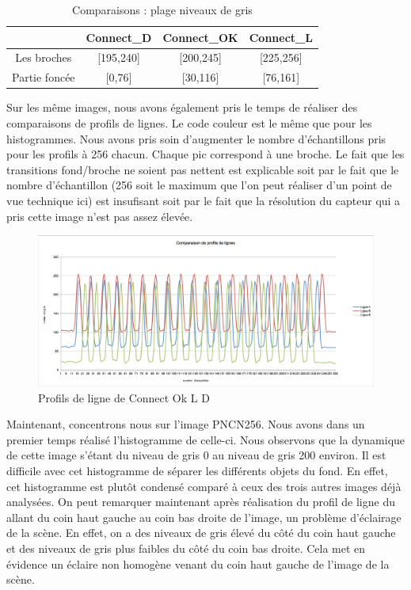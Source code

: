 \documentclass{scrreprt}
\begin{document}
\begin{table}[!h]
	\begin{center}
		\begin{tabular}{|c|c|c|c|}
		   \hline
		   & Connect_D & Connect_OK & Connect_L \\
		   \hline
		   Les broches & [195,240]& [200,245] & [225,256]\\
		   \hline
		   Partie foncée & [0,76] & [30,116] & [76,161]\\
		   \hline
		\end{tabular}
	\end{center}
	\caption{Comparaisons : plage niveaux de gris}
\end{table}

\newpage
Sur les même images, nous avons également pris le temps de réaliser des comparaisons de profils de lignes. Le code couleur est le même
que pour les histogrammes. Nous avons pris soin d'augmenter le nombre d'échantillons pris pour les profils à 256 chacun. Chaque pic 
correspond à une broche. Le fait que les transitions fond/broche ne soient pas nettent est explicable soit par le fait que le nombre
d'échantillon (256 soit le maximum que l'on peut réaliser d'un point de vue technique ici) est insufisant soit par le fait que la résolution
du capteur qui a pris cette image n'est pas assez élevée.

\begin{figure}[!h]
\centering
\includegraphics[width=15cm]{images/profildeligne1.png}
\caption{Profils de ligne de Connect Ok L D}
\end{figure}

\newpage
Maintenant, concentrons nous sur l'image PNCN256. Nous avons dans un premier temps réalisé l'histogramme de celle-ci. Nous observons que 
la dynamique de cette image s'étant du niveau de gris 0 au niveau de gris 200 environ. Il est difficile avec cet histogramme de séparer
les différents objets du fond. En effet, cet histogramme est plutôt condensé comparé à ceux des trois autres images déjà analysées. 
On peut remarquer maintenant après réalisation du profil de ligne du allant du coin haut gauche au coin bas droite de l'image, un problème 
d'éclairage de la scène. En effet, on a des niveaux de gris élevé du côté du coin haut gauche et des niveaux de gris plus faibles du côté 
du coin bas droite. Cela met en évidence un éclaire non homogène venant du coin haut gauche de l'image de la scène. 
  
\end{document}
